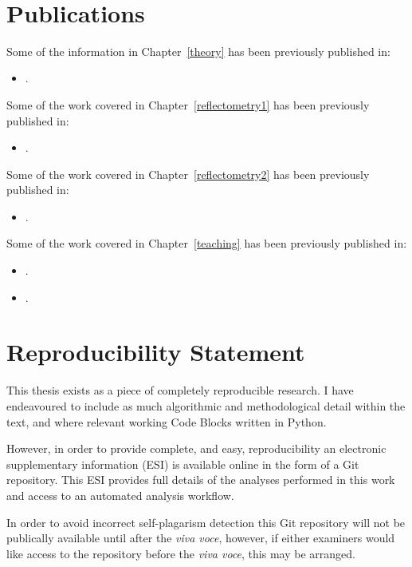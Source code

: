 \documentclass[twoside,symmetric,nobib]{./arm-thesis}
\newcommand{\blankpage}{\newpage\hbox{}\thispagestyle{empty}\newpage}
\begin{document}
\blankpage

\newpage
\begin{fullwidth}
\thispagestyle{empty}
\setlength{\parindent}{0pt}
\setlength{\parskip}{\baselineskip}
~\vfill

\chapter*{Publications}
Some of the information in Chapter~\ref{theory} has been previously published in:
\begin{itemize}
  \item \cite{mccluskey_model-dependent_2018}.
\end{itemize}
Some of the work covered in Chapter~\ref{reflectometry1} has been previously published in:
\begin{itemize}
  \item \cite{mccluskey_bayesian_2019}.
\end{itemize}
Some of the work covered in Chapter~\ref{reflectometry2} has been previously published in:
\begin{itemize}
  \item \cite{mccluskey_assessing_2019}.
\end{itemize}
Some of the work covered in Chapter~\ref{teaching} has been previously published in:
\begin{itemize}
  \item \cite{mccluskey_pylj_2018}.
  \item \cite{mccluskey_introduction_2019}.
\end{itemize}

\chapter*{Reproducibility Statement}
This thesis exists as a piece of completely reproducible research.
I have endeavoured to include as much algorithmic and methodological detail within the text, and where relevant working Code Blocks written in Python.

However, in order to provide complete, and easy, reproducibility an electronic supplementary information (ESI) is available online in the form of a Git repository.
This ESI provides full details of the analyses performed in this work and access to an automated analysis workflow.

In order to avoid incorrect self-plagarism detection this Git repository will not be publically available until after the \emph{viva voce}, however, if either examiners would like access to the repository before the \emph{viva voce}, this may be arranged.


~\vfill
\end{fullwidth}
\end{document}
